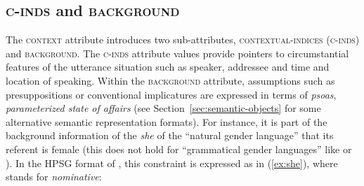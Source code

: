 \documentclass[output=paper,biblatex,babelshorthands,newtxmath,draftmode,colorlinks,citecolor=brown]{langscibook}
\begin{document}
\subsection{\textsc{c-inds} and \textsc{background}}
\label{sec:c-inds-background}

\largerpage[2] 
The \textsc{context} attribute introduces two sub-attributes, \textsc{contextual-indices} (\textsc{c-inds}) and \textsc{background}.
%
The \textsc{c-inds} attribute values provide pointers to circumstantial features of the utterance situation such as speaker, addressee and time and location of speaking.
%
Within the \textsc{background} attribute, assumptions such as presuppositions or conventional implicatures are expressed in terms of \emph{psoas}, \emph{parameterized state of affairs} (see Section~\ref{sec:semantic-objects} for some alternative semantic representation formats). 
%
For instance, it is part of the background information of the  \textit{she} of the \enquote{natural gender language}  that its referent is female (this does not hold for \enquote{grammatical gender languages} like  or ).
%
In the HPSG format of \citet[]{Pollard:Sag:1994}, this constraint is expressed as in (\ref{ex:she}), where  stands for \emph{nominative}:
%
\ea \label{ex:she}
\z
\end{document}
